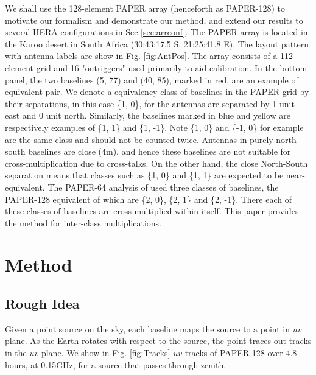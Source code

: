 \documentclass[twocolumn,apj,numberedappendix]{emulateapj}
\renewcommand\[{\begin{equation}}
\renewcommand\]{\end{equation}}
\begin{document}
We shall use the 128-element PAPER array (henceforth as PAPER-128) to motivate our formalism and demonstrate our method, and extend our results to several HERA configurations in Sec \ref{sec:arrconf}. 
The PAPER array is located in the Karoo desert in South Africa (30:43:17.5
S, 21:25:41.8 E). The layout pattern with antenna labels are show
in Fig. \ref{fig:AntPos}. The array consists of a 112-element grid and 16 "outriggers" used primarily to aid calibration.  In the bottom panel, the two baselines (5, 77) and (40, 85), marked in red, are an example of equivalent pair. We denote a equivalency-class of baselines in the PAPER grid by their separations, in this case  \{1, 0\}, for the
antennas are separated by 1 unit east and 0 unit north. Similarly,
the baselines marked in blue and yellow are respectively examples
of \{1, 1\} and \{1, -1\}.
Note \{1, 0\} and \{-1, 0\} for example are the same class and should
not be counted twice. Antennas in purely north-south baselines
are close (4m), and hence these baselines are not suitable
for cross-multiplication due to cross-talks. On the other hand, the close North-South separation means that classes such as \{1, 0\} and  \{1, 1\} are expected to be near-equivalent. The PAPER-64 analysis of \cite{Ali2015} used three classes of baselines, the PAPER-128
equivalent of which are 
\{2, 0\}, \{2, 1\} and \{2, -1\}. There each of these classes
of baselines are cross multiplied within itself. This paper provides the method for inter-class multiplications. 


\section{Method}

\subsection{Rough Idea}



Given a point source on the sky, each baseline maps the
source to a point in $uv$ plane. As the Earth rotates with respect to
the source, the point traces out tracks in the $uv$ plane. 
We show in Fig. \ref{fig:Tracks} $uv$ tracks of PAPER-128 over 4.8 hours, at 0.15GHz, for a source that passes through zenith. 
\end{document}
